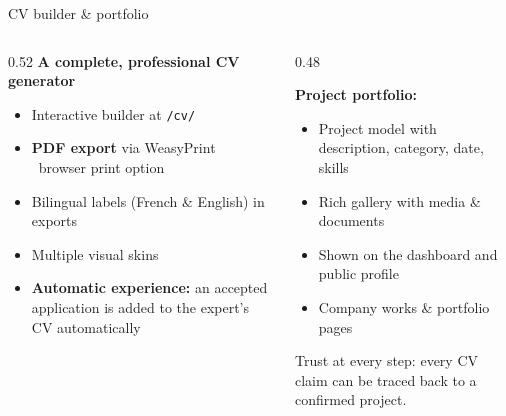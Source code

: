 \documentclass[aspectratio=169, 10pt]{beamer}
\newcommand{\keypoint}[1]{%
  \begin{tcolorbox}[enhanced, colback=utlight, colframe=utteal,
    boxrule=0pt, leftrule=3pt, arc=2pt, boxsep=4pt, left=6pt, right=6pt, top=4pt, bottom=4pt]
    \color{utnavy}#1
  \end{tcolorbox}%
}
\begin{document}
\begin{frame}{CV builder \& portfolio}
  \begin{columns}[T]
    \begin{column}{0.52\textwidth}
      \textbf{A complete, professional CV generator}
      \begin{itemize}
        \item Interactive builder at \texttt{/cv/}
        \item \textbf{PDF export} via WeasyPrint \textbullet\ browser print option
        \item Bilingual labels (French \& English) in exports
        \item Multiple visual skins
        \item \textbf{Automatic experience:} an accepted application is added to the expert's CV automatically
      \end{itemize}
    \end{column}
    \begin{column}{0.48\textwidth}
      \begin{tcolorbox}[enhanced, colback=utlight, colframe=utnavy, boxrule=0pt, leftrule=3pt, arc=2pt, boxsep=8pt]
        {\color{utnavy}\textbf{Project portfolio:}}\\[2pt]
        \begin{itemize}\small
          \item Project model with description, category, date, skills
          \item Rich gallery with media \& documents
          \item Shown on the dashboard and public profile
          \item Company works \& portfolio pages
        \end{itemize}
      \end{tcolorbox}
      \vspace{4pt}
      \keypoint{\small Trust at every step: every CV claim can be traced back to a confirmed project.}
    \end{column}
  \end{columns}
\end{frame}
\end{document}
